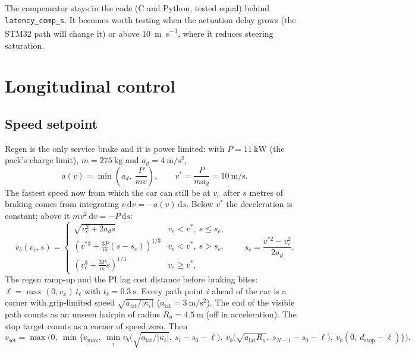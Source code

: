 \documentclass[11pt,a4paper]{article}
\begin{document}
The compensator stays in the code (C and Python, tested equal) behind
\texttt{latency\_comp\_s}. It becomes worth testing when the actuation delay grows (the
STM32 path will change it) or above \SI{10}{\metre\per\second}, where it reduces steering
saturation.

\section{Longitudinal control}

\subsection{Speed setpoint}
Regen is the only service brake and it is power limited: with $P = \SI{11}{\kilo\watt}$
(the pack's charge limit), $m = \SI{275}{\kilo\gram}$ and $a_d = \SI{4}{\metre\per\second\squared}$,
\begin{equation}
a(v) = \min\!\left(a_d,\ \frac{P}{m v}\right), \qquad v^* = \frac{P}{m a_d} = \SI{10}{\metre\per\second}.
\end{equation}
The fastest speed now from which the car can still be at $v_e$ after $s$ metres of
braking comes from integrating $v\,\mathrm{d}v = -a(v)\,\mathrm{d}s$. Below $v^*$ the
deceleration is constant; above it $m v^2\,\mathrm{d}v = -P\,\mathrm{d}s$:
\begin{equation}
v_b(v_e, s) =
\begin{cases}
\sqrt{v_e^2 + 2 a_d s} & v_e < v^*,\ s \le s_c, \\[2pt]
\left(v^{*3} + \frac{3P}{m}(s - s_c)\right)^{1/3} & v_e < v^*,\ s > s_c, \\[2pt]
\left(v_e^3 + \frac{3P}{m}s\right)^{1/3} & v_e \ge v^*,
\end{cases}
\qquad s_c = \frac{v^{*2} - v_e^2}{2 a_d}.
\label{eq:vb}
\end{equation}
The regen ramp-up and the PI lag cost distance before braking bites:
$\ell = \max(0, v_x)\,t_\ell$ with $t_\ell = \SI{0.3}{\second}$. Every path point $i$ ahead
of the car is a corner with grip-limited speed $\sqrt{a_{\text{lat}}/|\kappa_i|}$
($a_{\text{lat}} = \SI{3}{\metre\per\second\squared}$). The end of the visible path counts as an
unseen hairpin of radius $R_u = \SI{4.5}{\metre}$ (off in acceleration). The stop target
counts as a corner of speed zero. Then
\begin{equation}
v_{\text{set}} = \max\!\Big(0,\ \min\Big\{ v_{\max},\
  \min_{i} v_b\!\big(\sqrt{a_{\text{lat}}/|\kappa_i|},\ s_i - s_0 - \ell\big),\
  v_b\!\big(\sqrt{a_{\text{lat}} R_u},\ s_{N-1} - s_0 - \ell\big),\
  v_b(0,\ d_{\text{stop}} - \ell) \Big\}\Big).
\end{equation}
\end{document}
